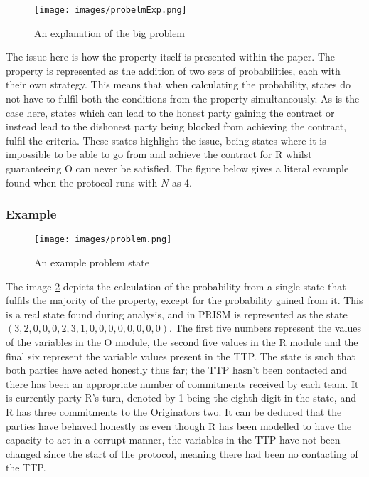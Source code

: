 \documentclass{l4proj}
\begin{document}
\begin{figure}[ht!]
\centering
\texttt{[image: images/probelmExp.png]}
\caption{An explanation of the big problem}
\label{finalProblem}
\end{figure}

The issue here is how the property itself is presented within the paper. The property is represented as the addition of two sets of probabilities, each with their own strategy. This means that when calculating the probability, states do not have to fulfil both the conditions from the property simultaneously. As is the case here, states which can lead to the honest party gaining the contract or instead lead to the dishonest party being blocked from achieving the contract, fulfil the criteria. These states highlight the issue, being states where it is impossible to be able to go from and achieve the contract for R whilst guaranteeing O can never be satisfied. The figure below gives a literal example found when the protocol runs with $N$ as 4.

\subsubsection{Example}

\begin{figure}[ht!]
\centering
\texttt{[image: images/problem.png]}
\caption{An example problem state}
\label{problemState}
\end{figure}

The image \ref{problemState} depicts the calculation of the probability from a single state that fulfils the majority of the property, except for the probability gained from it. This is a real state found during analysis, and in PRISM is represented as the state $(3,2,0,0,0,2,3,1,0,0,0,0,0,0,0,0)$. The first five numbers represent the values of the variables in the O module, the second five values in the R module and the final six represent the variable values present in the TTP. The state is such that both parties have acted honestly thus far; the TTP hasn't been contacted and there has been an appropriate number of commitments received by each team. It is currently party R's turn, denoted by 1 being the eighth digit in the state, and R has three commitments to the Originators two. It can be deduced that the parties have behaved honestly as even though R has been modelled to have the capacity to act in a corrupt manner, the variables in the TTP have not been changed since the start of the protocol, meaning there had been no contacting of the TTP.
\end{document}
